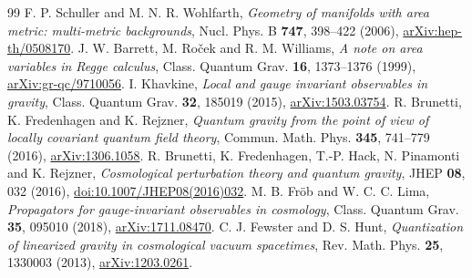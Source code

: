\documentclass[11pt]{article}
\begin{document}
\begin{thebibliography}{99}\small
{} F. P. Schuller and M. N. R. Wohlfarth, \emph{Geometry of manifolds with area metric: multi-metric backgrounds}, Nucl. Phys. B \textbf{747}, 398--422 (2006), \href{https://arxiv.org/abs/hep-th/0508170}{arXiv:hep-th/0508170}.
 J. W. Barrett, M. Ro\v{c}ek and R. M. Williams, \emph{A note on area variables in Regge calculus}, Class. Quantum Grav. \textbf{16}, 1373--1376 (1999), \href{https://arxiv.org/abs/gr-qc/9710056}{arXiv:gr-qc/9710056}.
 I. Khavkine, \emph{Local and gauge invariant observables in gravity}, Class. Quantum Grav. \textbf{32}, 185019 (2015), \href{https://arxiv.org/abs/1503.03754}{arXiv:1503.03754}.
 R. Brunetti, K. Fredenhagen and K. Rejzner, \emph{Quantum gravity from the point of view of locally covariant quantum field theory}, Commun. Math. Phys. \textbf{345}, 741--779 (2016), \href{https://arxiv.org/abs/1306.1058}{arXiv:1306.1058}.
 R. Brunetti, K. Fredenhagen, T.-P. Hack, N. Pinamonti and K. Rejzner, \emph{Cosmological perturbation theory and quantum gravity}, JHEP \textbf{08}, 032 (2016), \href{https://doi.org/10.1007/JHEP08(2016)032}{doi:10.1007/JHEP08(2016)032}.
 M. B. Fr\"ob and W. C. C. Lima, \emph{Propagators for gauge-invariant observables in cosmology}, Class. Quantum Grav. \textbf{35}, 095010 (2018), \href{https://arxiv.org/abs/1711.08470}{arXiv:1711.08470}.
 C. J. Fewster and D. S. Hunt, \emph{Quantization of linearized gravity in cosmological vacuum spacetimes}, Rev. Math. Phys. \textbf{25}, 1330003 (2013), \href{https://arxiv.org/abs/1203.0261}{arXiv:1203.0261}.
\end{thebibliography}
\end{document}
